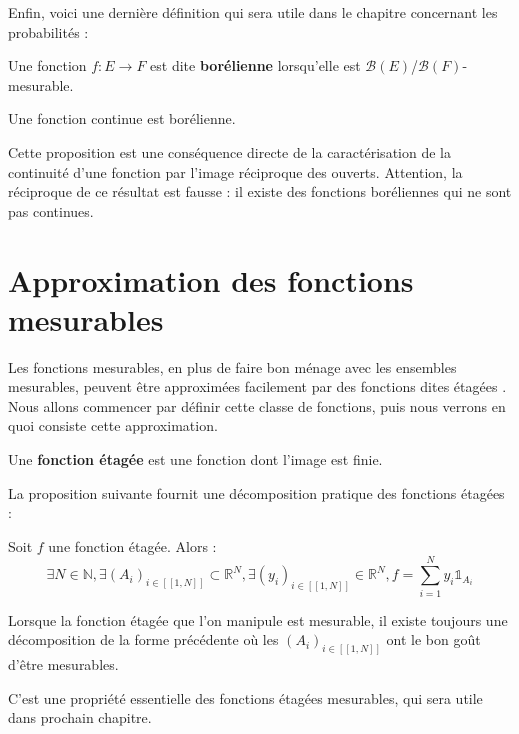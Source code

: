 \documentclass[../integ-proba.tex]{subfiles}
\begin{document}
  Enfin, voici une dernière définition qui sera utile dans le chapitre concernant les probabilités :

  \begin{defi}
    Une fonction $f:E\longrightarrow F$ est dite \textbf{borélienne} lorsqu'elle est $\mathcal{B}(E)$/$\mathcal{B}(F)$-mesurable.
  \end{defi}

  \begin{prop}
    \label{prop:continue_implique_borelienne}
    Une fonction continue est borélienne.
  \end{prop}

  \begin{rem}
    Cette proposition est une conséquence directe de la caractérisation de la continuité d'une fonction par l'image réciproque des ouverts.
    Attention, la réciproque de ce résultat est fausse : il existe des fonctions boréliennes qui ne sont pas continues.
  \end{rem}


  \section{Approximation des fonctions mesurables}

  Les fonctions mesurables, en plus de faire bon ménage avec les ensembles mesurables, peuvent être approximées facilement par des fonctions dites \og étagées \fg.
  Nous allons commencer par définir cette classe de fonctions, puis nous verrons en quoi consiste cette approximation.

  \begin{defi}
    Une \textbf{fonction étagée} est une fonction dont l'image est finie.
  \end{defi}

  La proposition suivante fournit une décomposition pratique des fonctions étagées :

  \begin{prop}
    Soit $f$ une fonction étagée. Alors :
    $$
    \exists N \in \mathbb{N}, \exists \left(A_i\right)_{i \in [\![1,N]\!]} \subset \mathbb{R}^N, \exists \left(y_i\right)_{i \in [\![1,N]\!]} \in \mathbb{R}^N, f = \sum_{i=1}^{N}y_i\mathds{1}_{A_i}
    $$
  \end{prop}

  \begin{rem}
    Lorsque la fonction étagée que l'on manipule est mesurable, il existe toujours une décomposition de la forme précédente où les $\left(A_i\right)_{i\in[\![1,N]\!]}$ ont le bon goût d'être mesurables.

    C'est une propriété essentielle des fonctions étagées mesurables, qui sera utile dans prochain chapitre.
  \end{rem}
\end{document}
